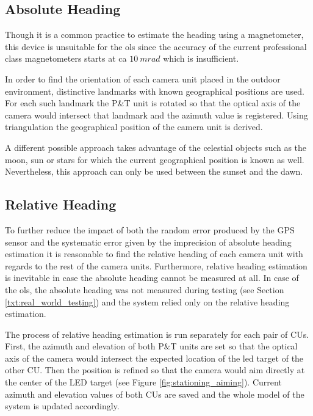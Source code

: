 \subsection{Absolute Heading} \label{txt:absolute_heading}

Though it is a common practice to estimate the heading using a magnetometer, this device is unsuitable for the \gls{ols} since the accuracy of the current professional class magnetometers starts at ca $10~mrad$ \cite{Honeywell:compassing_catalog} which is insufficient.

In order to find the orientation of each camera unit placed in the outdoor environment, distinctive landmarks with known geographical positions are used. For each such landmark the P\&T unit is rotated so that the optical axis of the camera would intersect that landmark and the azimuth value is registered. Using triangulation the geographical position of the camera unit is derived.

A different possible approach takes advantage of the celestial objects such as the moon, sun or stars for which the current geographical position is known as well. Nevertheless, this approach can only be used between the sunset and the dawn.

\subsection{Relative Heading}

To further reduce the impact of both the random error produced by the GPS sensor and the systematic error given by the imprecision of absolute heading estimation it is reasonable to find the relative heading of each camera unit with regards to the rest of the camera units. Furthermore, relative heading estimation is inevitable in case the absolute heading cannot be measured at all. In case of the \gls{ols}, the absolute heading was not measured during testing (see Section \ref{txt:real_world_testing}) and the system relied only on the relative heading estimation.

The process of relative heading estimation is run separately for each pair of CUs. First, the azimuth and elevation of both P\&T units are set so that the optical axis of the camera would intersect the expected location of the \gls{led} target of the other CU. Then the position is refined so that the camera would aim directly at the center of the LED target (see Figure \ref{fig:stationing_aiming}). Current azimuth and elevation values of both CUs are saved and the whole model of the system is updated accordingly.

